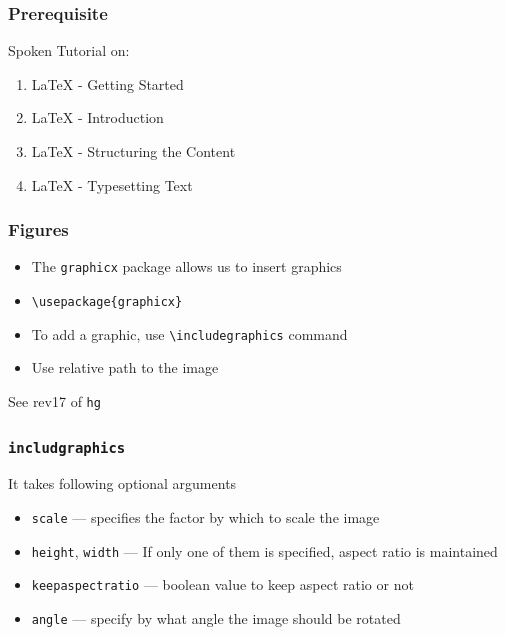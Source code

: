 \documentclass{beamer}
\newcommand{\typ}[1]{\lstinline{#1}}
\begin{document}
\begin{frame}
  \frametitle{Prerequisite}
  Spoken Tutorial on:
  \begin{enumerate}
  \item {\LaTeX} - Getting Started
  \item {\LaTeX} - Introduction
  \item {\LaTeX} - Structuring the Content
  \item {\LaTeX} - Typesetting Text
  \end{enumerate}
\end{frame}

\begin{frame}[fragile]
  \frametitle{Figures}
  \begin{itemize}
  \item The \typ{graphicx} package allows us to insert graphics
  \item \lstinline+\usepackage{graphicx}+
  \item To add a graphic, use \lstinline{\includegraphics} command
  \item Use relative path to the image
  \end{itemize}
  \tiny See rev17 of \typ{hg}
\end{frame}

\begin{frame}[fragile]
  \frametitle{\lstinline{includgraphics}}
  It takes following optional arguments
  \begin{itemize}
  \item \lstinline+scale+ --- specifies the factor by which to scale
    the image 
  \item \lstinline+height+, \lstinline+width+ --- If only one of them
    is specified, aspect ratio is maintained 
  \item \lstinline+keepaspectratio+ --- boolean value to keep aspect
    ratio or not 
  \item \lstinline+angle+ --- specify by what angle the image should
    be rotated 
  \end{itemize}
\end{frame}
\end{document}
